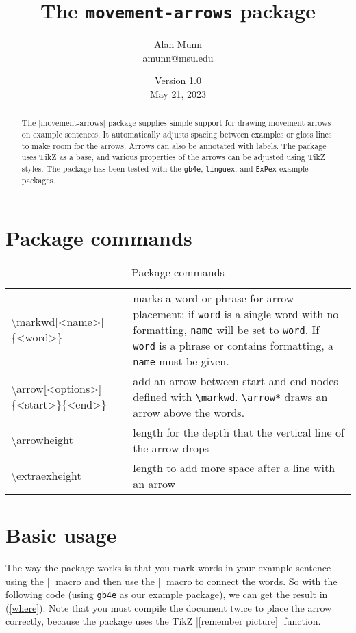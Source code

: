 \documentclass[11pt]{article}
\title{The \texttt{movement-arrows} package}
\author{Alan Munn\\amunn@msu.edu}
\date{Version 1.0\\May 21, 2023}
\newcommand*{\pkg}[1]{\texttt{#1}}
\newcommand*{\bs}{\textbackslash}
\begin{document}
\maketitle
\thispagestyle{empty}
\begin{abstract}{\noindent
The |movement-arrows| package supplies simple support for drawing movement arrows on example sentences. It automatically adjusts spacing between examples or gloss lines to make room for the arrows.  Arrows can also be annotated with labels.  The package uses TikZ as a base, and various properties of the arrows can be adjusted using TikZ styles. The package has been tested with the \pkg{gb4e}, \pkg{linguex}, and \pkg{ExPex} example packages.


}
\end{abstract}
\section{Package commands}
\begin{table}[htpb]
\centering
\begin{tabularx}{.9\textwidth}{t{l}X}
\toprule
\bs markwd[<name>]\{<word>\} & marks a word or phrase for arrow placement; if \pkg{word} is a single word with no formatting, \pkg{name} will be set to \pkg{word}. If \pkg{word} is a phrase or contains formatting, a \pkg{name} must be given.\\
\bs arrow[<options>]\{<start>\}\{<end>\} & add an arrow between start and end nodes defined with \pkg{\bs markwd}. \pkg{\bs arrow*} draws an arrow above the words.\\
\bs arrowheight & length for the depth that the vertical line of the arrow drops\\
\bs extraexheight & length to add more space after a line with an arrow\\
\bottomrule
\end{tabularx}
\caption{Package commands}
\end{table}
\section{Basic usage}
The way the package works is that you mark words in your example sentence using the |\mkword| macro and then use the |\arrow| macro to connect the words. So with the following code (using \pkg{gb4e} as our example package), we can get the result in (\ref{where}).  Note that you must compile the document twice to place the arrow correctly, because the package uses the TikZ |[remember picture]| function.
\end{document}
